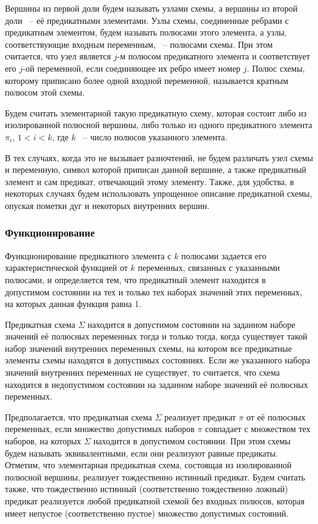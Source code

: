 \documentclass[12pt]{article}
\begin{document}
Вершины из первой доли будем называть узлами схемы, а вершины из второй доли ~-- её предикатными элементами. 
Узлы схемы, соединенные ребрами с предикатным элементом, будем называть полюсами этого элемента, 
а узлы, соответствующие входным переменным, ~-- полюсами схемы.
При этом считается, что узел является $j$-м полюсом предикатного элемента и соответствует 
его $j$-ой переменной, если соединяющее их ребро имеет номер $j$. Полюс схемы, которому приписано 
более одной входной переменной, называется кратным полюсом этой схемы. 

Будем считать элементарной такую предикатную схему, которая состоит либо из изолированной полюсной вершины, 
либо только из одного предикатного элемента $\pi_i$, $1 < i < k$, где $k$ ~-- число полюсов указанного элемента.

В тех случаях, когда это не вызывает разночтений, 
не будем различать узел схемы и переменную, 
символ которой приписан данной вершине, а также предикатный элемент и сам предикат, отвечающий этому элементу. 
Также, для удобства, в некоторых случаях будем использовать упрощенное описание предикатной схемы, 
опуская пометки дуг и некоторых внутренних вершин. 

\subsubsection*{Функционирование}
Функционирование предикатного элемента с $k$ полюсами задается его характеристической функцией от $k$ переменных, 
связанных с указанными полюсами, и определяется тем, что предикатный элемент находится в допустимом состоянии на тех и 
только тех наборах значений этих переменных, на которых данная функция равна 1. 

Предикатная схема $\Sigma$ находится в допустимом состоянии на заданном наборе значений её полюсных переменных тогда и только тогда, 
когда существует такой набор значений внутренних переменных схемы, на котором все предикатные элементы схемы находятся в допустимых состояниях. 
Если же указанного набора значений внутренних переменных не существует, то считается, что схема находится в недопустимом состоянии на 
заданном наборе значений её полюсных переменных.

Предполагается, что предикатная схема $\Sigma$ реализует предикат $\pi$ от её полюсных переменных, если множество допустимых наборов $\pi$ 
совпадает с множеством тех наборов, на которых $\Sigma$ находится в допустимом состоянии. 
При этом схемы будем называть эквивалентными, если они реализуют равные предикаты. 
Отметим, что элементарная предикатная схема, состоящая из изолированной полюсной вершины, реализует тождественно истинный предикат.
 Будем считать также, что тождественно истинный (соответственно тождественно ложный)
 предикат реализуется любой предикатной схемой без входных полюсов, 
которая имеет непустое (соответственно пустое) множество допустимых состояний.
\end{document}
